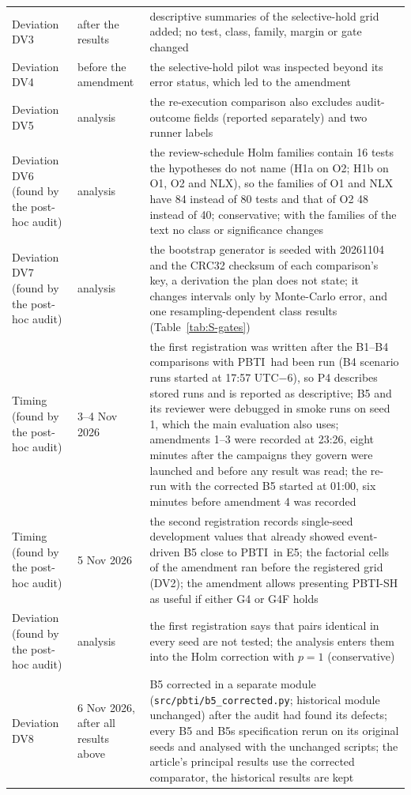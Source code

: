 \documentclass[10pt,a4paper]{article}
\newcommand{\sys}{PBTI}
\begin{document}
\begin{table}[!htbp]
\begin{tabularx}{\linewidth}{p{3.2cm}p{2.9cm}X}
Deviation DV3 & after the results & descriptive summaries of the selective-hold grid added; no test, class, family, margin or gate changed\\
Deviation DV4 & before the amendment & the selective-hold pilot was inspected beyond its error status, which led to the amendment\\
Deviation DV5 & analysis & the re-execution comparison also excludes audit-outcome fields (reported separately) and two runner labels\\
Deviation DV6 (found by the post-hoc audit) & analysis & the review-schedule Holm families contain 16 tests the hypotheses do not name (H1a on O2; H1b on O1, O2 and NLX), so the families of O1 and NLX have 84 instead of 80 tests and that of O2 48 instead of 40; conservative; with the families of the text no class or significance changes\\
Deviation DV7 (found by the post-hoc audit) & analysis & the bootstrap generator is seeded with 20261104 and the CRC32 checksum of each comparison's key, a derivation the plan does not state; it changes intervals only by Monte-Carlo error, and one resampling-dependent class results (Table~\ref{tab:S-gates})\\
Timing (found by the post-hoc audit) & 3--4 Nov 2026 & the first registration was written after the B1--B4 comparisons with \sys\ had been run (B4 scenario runs started at 17:57 UTC$-$6), so P4 describes stored runs and is reported as descriptive; B5 and its reviewer were debugged in smoke runs on seed 1, which the main evaluation also uses; amendments 1--3 were recorded at 23:26, eight minutes after the campaigns they govern were launched and before any result was read; the re-run with the corrected B5 started at 01:00, six minutes before amendment 4 was recorded\\
Timing (found by the post-hoc audit) & 5 Nov 2026 & the second registration records single-seed development values that already showed event-driven B5 close to \sys\ in E5; the factorial cells of the amendment ran before the registered grid (DV2); the amendment allows presenting PBTI-SH as useful if either G4 or G4F holds\\
Deviation (found by the post-hoc audit) & analysis & the first registration says that pairs identical in every seed are not tested; the analysis enters them into the Holm correction with $p=1$ (conservative)\\
Deviation DV8 & 6 Nov 2026, after all results above & B5 corrected in a separate module (\texttt{src/\allowbreak{}pbti/\allowbreak{}b5\_\allowbreak{}corrected.py}; historical module unchanged) after the audit had found its defects; every B5 and B5s specification rerun on its original seeds and analysed with the unchanged scripts; the article's principal results use the corrected comparator, the historical results are kept\\

\end{tabularx}
\end{table}
\end{document}
